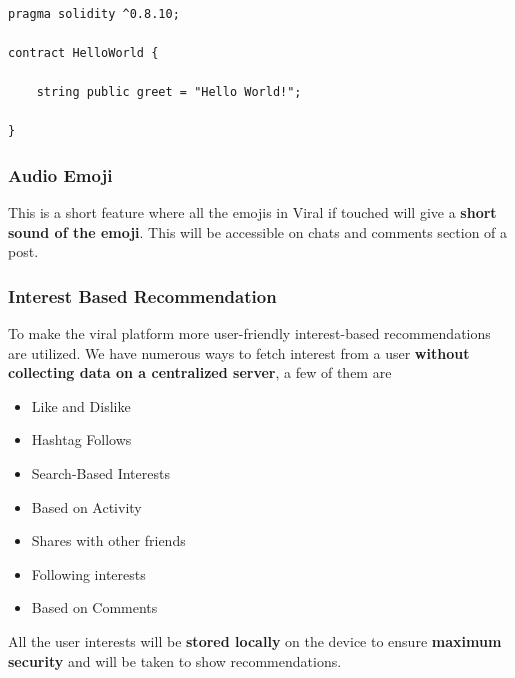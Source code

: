 \documentclass[10pt]{article}
\begin{document}

\begin{lstlisting}[language=Solidity, caption={GunDB Privacy Group Snippet}]

pragma solidity ^0.8.10;

contract HelloWorld {

    string public greet = "Hello World!";
    
}
\end{lstlisting}

\subsubsection{Audio Emoji}

This is a short feature where all the emojis in Viral if touched will give a \textbf{short sound of the emoji}. This will be accessible on chats and comments section of a post.\\

\subsubsection{Interest Based Recommendation}

To make the viral platform more user-friendly interest-based recommendations are utilized. We have numerous ways to fetch interest from a user \textbf{without collecting data on a centralized server}, a few of them are\\

\begin{itemize}[leftmargin=+0.2in]
\item Like and Dislike
\item Hashtag Follows
\item Search-Based Interests
\item Based on Activity
\item Shares with other friends
\item Following interests
\item Based on Comments
\end{itemize}

All the user interests will be \textbf{stored locally} on the device to ensure \textbf{maximum security} and will be taken to show recommendations.\\
\end{document}
